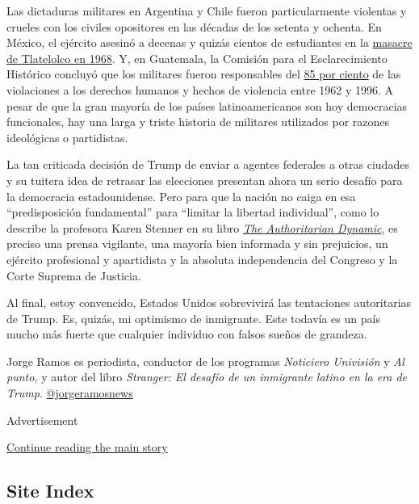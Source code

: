 Las dictaduras militares en Argentina y Chile fueron particularmente
violentas y crueles con los civiles opositores en las décadas de los
setenta y ochenta. En México, el ejército asesinó a decenas y quizás
cientos de estudiantes en la
\href{https://www.nytimes3xbfgragh.onion/es/2018/09/30/espanol/opinion/opinion-enrique-krauze-tlatelolco-68.html}{masacre
de Tlatelolco en 1968}. Y, en Guatemala, la Comisión para el
Esclarecimiento Histórico concluyó que los militares fueron responsables
del
\href{http://www.centrodememoriahistorica.gov.co/descargas/guatemala-memoria-silencio/guatemala-memoria-del-silencio.pdf}{85
por ciento} de las violaciones a los derechos humanos y hechos de
violencia entre 1962 y 1996. A pesar de que la gran mayoría de los
países latinoamericanos son hoy democracias funcionales, hay una larga y
triste historia de militares utilizados por razones ideológicas o
partidistas.

La tan criticada decisión de Trump de enviar a agentes federales a otras
ciudades y su tuitera idea de retrasar las elecciones presentan ahora un
serio desafío para la democracia estadounidense. Pero para que la nación
no caiga en esa ``predisposición fundamental'' para ``limitar la
libertad individual'', como lo describe la profesora Karen Stenner en su
libro
\href{https://www.cambridge.org/core/books/authoritarian-dynamic/7620B99124ED2DBFC6394444838F455A}{\emph{The
Authoritarian Dynamic}}, es preciso una prensa vigilante, una mayoría
bien informada y sin prejuicios, un ejército profesional y apartidista y
la absoluta independencia del Congreso y la Corte Suprema de Justicia.

Al final, estoy convencido, Estados Unidos sobrevivirá las tentaciones
autoritarias de Trump. Es, quizás, mi optimismo de inmigrante. Este
todavía es un país mucho más fuerte que cualquier individuo con falsos
sueños de grandeza.

Jorge Ramos es periodista, conductor de los programas \emph{Noticiero
Univisión} y \emph{Al punto,} y autor del libro \emph{Stranger: El
desafío de un inmigrante latino en la era de Trump}.
\href{https://twitter.com/jorgeramosnews}{@jorgeramosnews}

Advertisement

\protect\hyperlink{after-bottom}{Continue reading the main story}

\hypertarget{site-index}{%
\subsection{Site Index}\label{site-index}}

